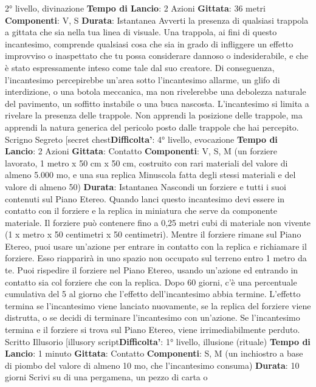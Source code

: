 \begin{multicols}{2}
2° livello, divinazione
\textbf{Tempo di Lancio}: 2 Azioni
\textbf{Gittata}: 36 metri
\textbf{Componenti}: V, S
\textbf{Durata}: Istantanea
Avverti la presenza di qualsiasi trappola a gittata che
sia nella tua linea di visuale. Una trappola, ai fini di
questo incantesimo, comprende qualsiasi cosa che sia
in grado di infliggere un effetto improvviso o inaspettato
che tu possa considerare dannoso o indesiderabile, e
che è stato espressamente inteso come tale dal suo
creatore. Di conseguenza, l’incantesimo percepirebbe
un’area sotto l’incantesimo allarme, un glifo di
interdizione, o una botola meccanica, ma non
rivelerebbe una debolezza naturale del pavimento, un
soffitto instabile o una buca nascosta.
L’incantesimo si limita a rivelare la presenza delle
trappole. Non apprendi la posizione delle trappole, ma
apprendi la natura generica del pericolo posto dalle
trappole che hai percepito.
Scrigno Segreto
[secret chest\textbf{Difficolta'}:
4° livello, evocazione
\textbf{Tempo di Lancio}: 2 Azioni
\textbf{Gittata}: Contatto
\textbf{Componenti}: V, S, M (un forziere lavorato, 1 metro x
50 cm x 50 cm, costruito con rari materiali del valore di
almeno 5.000 mo, e una sua replica Minuscola fatta
degli stessi materiali e del valore di almeno 50)
\textbf{Durata}: Istantanea
Nascondi un forziere e tutti i suoi contenuti sul Piano
Etereo. Quando lanci questo incantesimo devi essere in
contatto con il forziere e la replica in miniatura che
serve da componente materiale. Il forziere può
contenere fino a 0,25 metri cubi di materiale non
vivente (1 x metro x 50 centimetri x 50 centimetri).
Mentre il forziere rimane sul Piano Etereo, puoi usare
un’azione per entrare in contatto con la replica e
richiamare il forziere. Esso riapparirà in uno spazio non
occupato sul terreno entro 1 metro da te. Puoi
rispedire il forziere nel Piano Etereo, usando un’azione
ed entrando in contatto sia col forziere che con la
replica.
Dopo 60 giorni, c’è una percentuale cumulativa del 5%
al giorno che l’effetto dell’incantesimo abbia termine.
L’effetto termina se l’incantesimo viene lanciato
nuovamente, se la replica del forziere viene distrutta, o
se decidi di terminare l’incantesimo con un’azione. Se
l’incantesimo termina e il forziere si trova sul Piano
Etereo, viene irrimediabilmente perduto.
Scritto Illusorio
[illusory script\textbf{Difficolta'}:
1° livello, illusione (rituale)
\textbf{Tempo di Lancio}: 1 minuto
\textbf{Gittata}: Contatto
\textbf{Componenti}: S, M (un inchiostro a base di piombo del
valore di almeno 10 mo, che l’incantesimo consuma)
\textbf{Durata}: 10 giorni
Scrivi su di una pergamena, un pezzo di carta o

\end{multicols}
